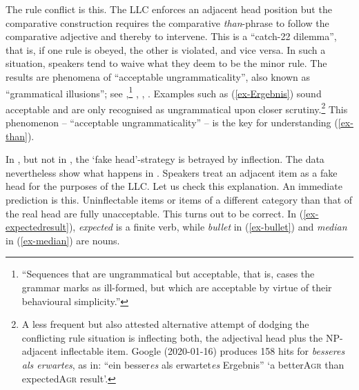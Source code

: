 \documentclass[output=paper
  ,nobabel
  ,uniformtopskip %
]{langscibook}
\begin{document}
\noindent
The rule conflict is this. The LLC enforces an adjacent head position but the comparative construction requires the comparative \emph{than}-phrase to follow the comparative adjective and thereby to intervene. This is a ``catch-22 dilemma'', that is, if one rule is obeyed, the other is violated, and vice versa. In such a situation, speakers tend to waive what they deem to be the minor rule. The results are phenomena of ``acceptable ungrammaticality'', also known as ``grammatical illusions''; see \citet*[159]{Bever1976},\footnote{``Sequences that are ungrammatical but acceptable, that is, cases the grammar marks as ill-formed, but which are acceptable by virtue of their behavioural simplicity.''}  \citet{Haider2011}, \citet{PhillipsLau2011}, \citet{Frazier2015}. Examples such as (\ref{ex-Ergebnis}) sound acceptable and are only recognised as ungrammatical upon closer scrutiny.\footnote{A less frequent but also attested alternative attempt of dodging the conflicting rule situation is inflecting both, the adjectival head plus the NP-adjacent inflectable item. Google (2020-01-16) produces 158 hits for \emph{besseres als erwartes}, as in:  ``ein besser\emph{es} als erwartet\emph{es} Ergebnis'' `a better\textsc{Agr} than expected\textsc{Agr} result'.}  This phenomenon – ``acceptable ungrammaticality'' – is the key for understanding (\ref{ex-than}).

In , but not in , the `fake head'-strategy is betrayed by inflection. The  data nevertheless show what happens in . Speakers treat an adjacent item as a fake head for the purposes of the LLC. Let us check this explanation. An immediate prediction is this. Uninflectable items or items of a different category than that of the real head are fully unacceptable. This turns out to be correct. In (\ref{ex-expectedresult}), \emph{expected} is a finite verb, while \emph{bullet} in (\ref{ex-bullet}) and \emph{median} in (\ref{ex-median}) are nouns.

\eal
{}

\label{ex-bullet}

\label{ex-median}

\zl
\end{document}
